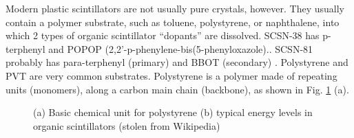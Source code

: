 Modern plastic scintillators are not usually pure crystals, however.
They usually contain a polymer substrate, such as toluene, polystyrene,
or naphthalene, into which 2 types of organic scintillator
``dopants'' are dissolved. SCSN-38 has
 p-terphenyl and POPOP (2,2'-p-phenylene-bis(5-phenyloxazole).\cite{what}.
SCSN-81 probably has para-terphenyl (primary) and BBOT (secondary)
\cite{anna}.
Polystyrene and PVT are very common substrates.  Polystyrene is 
a polymer made of 
repeating
units (monomers), along a carbon main chain (backbone), as shown in Fig. \ref{fig:polystyrene} (a).




\begin{figure}[!htbp]
\centering
\caption{
(a)
Basic chemical unit for polystyrene
(b)
typical energy levels in organic scintillators (stolen from Wikipedia)
}
\label{fig:polystyrene}
\end{figure}



